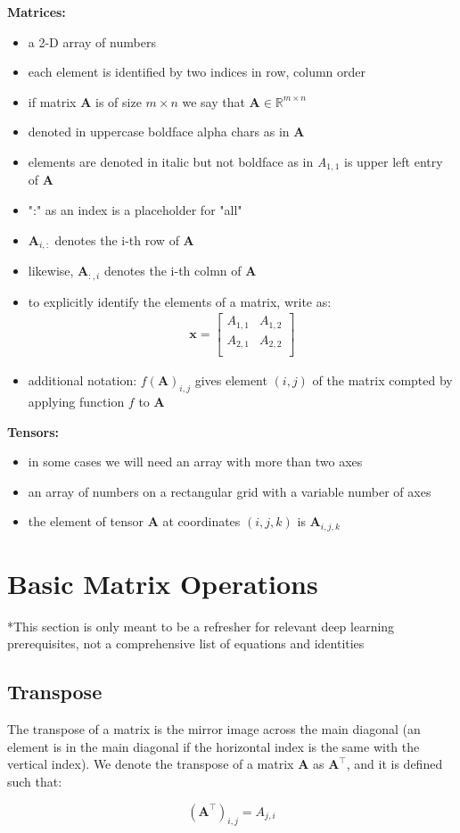 \documentclass[11pt,twocolumn]{report}
\def\realnumbers{\mathbb{R}}
\begin{document}
\large\textbf{Matrices:}
\begin{itemize}
	\item a 2-D array of numbers
	\item each element is identified by two indices in row, column order
	\item if matrix $\bm{A}$ is of size $m \times n$ we say that $\bm{A} \in
		\realnumbers^{m \times n}$
	\item denoted in uppercase boldface alpha chars as in $\bm{A}$
	\item elements are denoted in italic but not boldface as in
		\textit{A}$_{1,1}$ is upper left entry of $\bm{A}$
	\item ":" as an index is a placeholder for "all"
	\item $\bm{A}_{i,:}$ denotes the i-th row of $\bm{A}$
	\item likewise, $\bm{A}_{:,i}$ denotes the i-th colmn of $\bm{A}$
	\item to explicitly identify the elements of a matrix, write as:
		\begin{gather}
			\bm{x} = 
			\begin{bmatrix}
				A_{1,1} & A_{1, 2}\\
				A_{2,1} & A_{2, 2}\\
			\end{bmatrix}
		\end{gather}
	\item additional notation: $f(\bm{A})_{i, j}$ gives element $(i, j)$ of the
		matrix compted by applying function $f$ to $\bm{A}$
\end{itemize}

\large\textbf{Tensors:}
\begin{itemize}
	\item in some cases we will need an array with more than two axes
	\item an array of numbers on a rectangular grid with a variable number of axes
	\item the element of tensor $\bm{A}$ at coordinates $(i, j, k)$ is
		$\bm{A}_{i, j, k}$
\end{itemize}

\section{Basic Matrix Operations}
{\tiny**This section is only meant to be a refresher for relevant deep learning
	prerequisites, not a comprehensive list of equations and identities}
\subsection{Transpose}
\begin{flushleft}
	The transpose of a matrix is the mirror image across the main diagonal (an
	element is in the main diagonal if the horizontal index is the same with the
	vertical index). We denote the transpose of a matrix $\bm{A}$ as
	$\bm{A}^\intercal$, and it is defined such that:
\end{flushleft}
\begin{equation}
	(\bm{A}^\intercal)_{i, j} = A_{j, i}
\end{equation}
\end{document}
